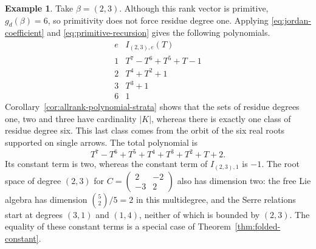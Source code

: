 \documentclass[11pt, reqno]{amsart}
\numberwithin{equation}{section}
\theoremstyle{definition}
\newtheorem{example}[theorem]{Example}
\theoremstyle{remark}
\begin{document}
\begin{example}\label{ex:indefinite-four-degrees}
Take $\beta=(2,3)$. Although this rank vector is primitive,
$g_d(\beta)=6$, so primitivity does not force residue degree one.
Applying \eqref{eq:jordan-coefficient} and
\eqref{eq:primitive-recursion} gives the following polynomials.
\[
\begin{array}{c|l}
 e&I_{(2,3),e}(T)\\ \hline
 1&T^7-T^6+T^5+T-1\\
 2&T^4+T^2+1\\
 3&T^3+1\\
 6&1
\end{array}
\]
Corollary~\ref{cor:allrank-polynomial-strata} shows that the sets
of residue degrees one, two and three have cardinality $|K|$, whereas
there is exactly one class of residue degree six. This last class
comes from the orbit of the six real roots supported on single
arrows.
The total polynomial is
\[ T^7-T^6+T^5+T^4+T^3+T^2+T+2. \]
Its constant term is two, whereas the constant term of
$I_{(2,3),1}$ is $-1$.
The root space of degree $(2,3)$ for
$C=\left(\begin{smallmatrix}2&-2\\-3&2\end{smallmatrix}\right)$
also has dimension two: the free Lie algebra has dimension
$\binom{5}{2}/5=2$ in this multidegree, and the Serre relations start
at degrees $(3,1)$ and $(1,4)$, neither of which is bounded by
$(2,3)$. The equality of these constant terms is a special case of
Theorem~\ref{thm:folded-constant}.
\end{example}
\end{document}
